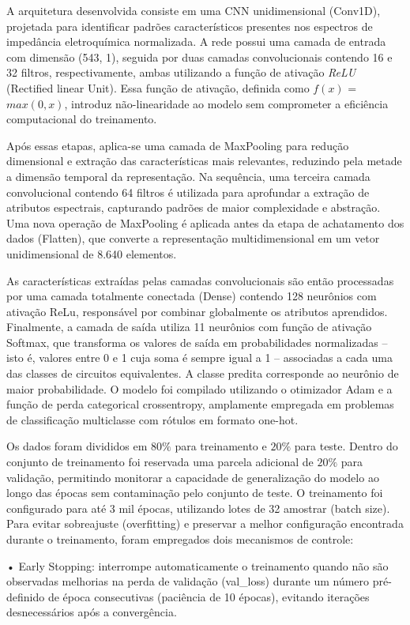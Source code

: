 A arquitetura desenvolvida consiste em uma CNN unidimensional (Conv1D), projetada
para identificar padrões característicos presentes nos espectros de impedância eletroquímica
normalizada. A rede possui uma camada de entrada com dimensão (543, 1), seguida por duas
camadas convolucionais contendo 16 e 32 filtros, respectivamente, ambas utilizando a função
de ativação \textit{ReLU} (Rectified linear Unit). Essa função de ativação, definida como $f(x)$ = $max(0,x)$, introduz não-linearidade ao modelo sem comprometer a eficiência computacional
do treinamento. 

Após essas etapas, aplica-se uma camada de MaxPooling para redução
dimensional e extração das características mais relevantes, reduzindo pela metade a dimensão
temporal da representação. Na sequência, uma terceira camada convolucional contendo 64
filtros é utilizada para aprofundar a extração de atributos espectrais, capturando padrões de
maior complexidade e abstração. Uma nova operação de MaxPooling é aplicada antes da etapa
de achatamento dos dados (Flatten), que converte a representação multidimensional em um
vetor unidimensional de 8.640 elementos.

As características extraídas pelas camadas
convolucionais são então processadas por uma camada totalmente conectada (Dense) contendo
128 neurônios com ativação ReLu, responsável por combinar globalmente os atributos
aprendidos. Finalmente, a camada de saída utiliza 11 neurônios com função de ativação
Softmax, que transforma os valores de saída em probabilidades normalizadas – isto é, valores
entre 0 e 1 cuja soma é sempre igual a 1 – associadas a cada uma das classes de circuitos
equivalentes. A classe predita corresponde ao neurônio de maior probabilidade. O modelo foi
compilado utilizando o otimizador Adam e a função de perda categorical crossentropy,
amplamente empregada em problemas de classificação multiclasse com rótulos em formato
one-hot.

Os dados foram divididos em $80\%$ para treinamento e $20\%$ para teste. Dentro do
conjunto de treinamento foi reservada uma parcela adicional de $20\%$ para validação,
permitindo monitorar a capacidade de generalização do modelo ao longo das épocas sem
contaminação pelo conjunto de teste. O treinamento foi configurado para até 3 mil épocas,
utilizando lotes de 32 amostrar (batch size). Para evitar sobreajuste (overfitting) e preservar a
melhor configuração encontrada durante o treinamento, foram empregados dois mecanismos
de controle:

• Early Stopping: interrompe automaticamente o treinamento quando não são observadas
melhorias na perda de validação (val\_loss) durante um número pré-definido de época
consecutivas (paciência de 10 épocas), evitando iterações desnecessários após a
convergência.

